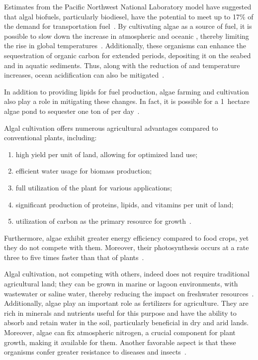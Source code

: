Estimates from the Pacific Northwest National Laboratory model have suggested that algal biofuels, particularly biodiesel, have the potential to meet up to 17\% of the demand for transportation fuel~\parencite{dalrymple_Wastewater_2013}. By cultivating algae as a source of fuel, it is possible to slow down the increase in atmospheric and oceanic , thereby limiting the rise in global temperatures~\parencite{raven_possible_2017}. Additionally, these organisms can enhance the sequestration of organic carbon for extended periods, depositing it on the seabed and in aquatic sediments. Thus, along with the reduction of  and temperature increases, ocean acidification can also be mitigated~\parencite{prasad_Role_2021}.

In addition to providing lipids for fuel production, algae farming and cultivation also play a role in mitigating these changes. In fact, it is possible for a 1~hectare algae pond to sequester one ton of  per day~\parencite{proksch_growing_2013}.

Algal cultivation offers numerous agricultural advantages compared to conventional plants, including:
\begin{enumerate}
\item high yield per unit of land, allowing for optimized land use;
\item efficient water usage for biomass production;
\item full utilization of the plant for various applications;
\item significant production of proteins, lipids, and vitamins per unit of land;
\item utilization of carbon as the primary resource for growth~\parencite{sivakumar_role_2013s}.
\end{enumerate}

Furthermore, algae exhibit greater energy efficiency compared to food crops, yet they do not compete with them. Moreover, their photosynthesis occurs at a rate three to five times faster than that of plants~\parencite{salami_AlgaeBased_2021}.

Algal cultivation, not competing with others, indeed does not require traditional agricultural land; they can be grown in marine or lagoon environments, with wastewater or saline water, thereby reducing the impact on freshwater resources~\parencite{narala_Comparison_2016}. Additionally, algae play an important role as fertilizers for agriculture. They are rich in minerals and nutrients useful for this purpose and have the ability to absorb and retain water in the soil, particularly beneficial in dry and arid lands. Moreover, algae can fix atmospheric nitrogen, a crucial component for plant growth, making it available for them. Another favorable aspect is that these organisms confer greater resistance to diseases and insects~\parencite{garima_diverse_2015}.

